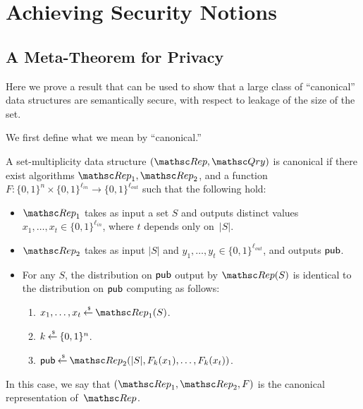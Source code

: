 \section{Achieving Security Notions}

\subsection{A Meta-Theorem for Privacy}
Here we prove a result that can be used to show that a large class of ``canonical''
data structures are semantically secure, with respect to leakage of the size of the set.

We first define what we mean by ``canonical.''

\def\bool{\{0,1\}}

\begin{definition}
A set-multiplicity data structure $(\Rep, \Qry)$ is {\sf canonical} if
there exist algorithms $\Rep_1, \Rep_2$, and a function
$F: \bool^n \times \bool^{\ell_{in}} \rightarrow \bool^{\ell_{out}}$
such that the following hold:
\begin{itemize}
\item $\Rep_1$ takes as input a set $S$ and outputs distinct values $x_1, \ldots, x_t \in \bool^{\ell_{in}}$,
where $t$ depends only on~$|S|$.
\item $\Rep_2$ takes as input $|S|$ and $y_1, \ldots, y_t \in \bool^{\ell_{out}}$, and outputs
${\sf pub}$.
\item For any $S$, the distribution on ${\sf pub}$ output by $\Rep(S)$ is identical to the distribution
on ${\sf pub}$ computing as follows:
\begin{enumerate}
\item $x_1, \ldots, x_t \getsr \Rep_1(S)$.
\item $k \getsr \bool^n$.
\item $\pubaux \getsr \Rep_2(|S|, F_k(x_1), \ldots, F_k(x_t))$.
\end{enumerate}
\end{itemize}
In this case, we say that $(\Rep_1, \Rep_2, F)$ is the {\sf canonical representation}
of~$\Rep$.
\end{definition}

